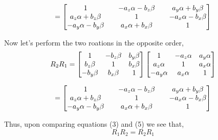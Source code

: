 \documentclass[a4paper]{article}
\begin{document}
\begin{qalist}
			\begin{equation}
				= 
				\left[ \begin{matrix}
				1 && \textit{$ - {a}_{z}\alpha  - {b}_{z}\beta$} && \textit{${a}_{y}\alpha  + {b}_{y}\beta$} \\
				\textit{${a}_{z}\alpha  + {b}_{z}\beta$} && 1 && \textit{$ - {a}_{x}\alpha  - {b}_{x}\beta$} \\
				\textit{$ - {a}_{y}\alpha  - {b}_{y}\beta$} && \textit{${a}_{x}\alpha + {b}_{x}\beta$} && 1
				\end{matrix}\right]
			\end{equation}
			
			Now let's perform the two roations in the opposite order, 
			\begin{equation}
				{R}_{2}{R}_{1} = 
				\left[ \begin{matrix} 
					\textit{$1$} & \textit{$ - {b}_{z}\beta$} & \textit{${b}_{y}\beta$} \\
					\textit{${b}_{z}\beta$} & \textit{$1$} & \textit{${b}_{x}\beta$} \\
					\textit{$- {b}_{y}\beta$} & \textit{${b}_{x}\beta$} & \textit{$1$}
				\end{matrix} \right]
				\left[ \begin{matrix} 
					\textit{$1$} & \textit{$ - {a}_{z}\alpha$} & \textit{${a}_{y}\alpha$} \\
					\textit{${a}_{z}\alpha$} & \textit{$1$} & \textit{${a}_{x}\alpha$} \\
					\textit{$- {a}_{y}\alpha$} & \textit{${a}_{x}\alpha$} & \textit{$1$}
				\end{matrix} \right]
			\end{equation}
			
			\begin{equation}
				= 
				\left[ \begin{matrix}
				1 && \textit{$ - {a}_{z}\alpha  - {b}_{z}\beta$} && \textit{${a}_{y}\alpha  + {b}_{y}\beta$} \\
				\textit{${a}_{z}\alpha  + {b}_{z}\beta$} && 1 && \textit{$ - {a}_{x}\alpha  - {b}_{x}\beta$} \\
				\textit{$ - {a}_{y}\alpha  - {b}_{y}\beta$} && \textit{${a}_{x}\alpha + {b}_{x}\beta$} && 1
				\end{matrix}\right]
			\end{equation}
			
			Thus, upon comparing equations (3) and (5) we see that, 
						\begin{equation}
				{R}_{1}{R}_{2} = {R}_{2}{R}_{1} \end{equation}
				

\end{qalist}
\end{document}
